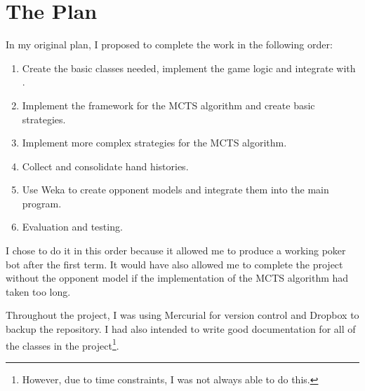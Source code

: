 \section{The Plan}								%




In my original plan, I proposed to complete the work in the following order:
\begin{enumerate}
\item Create the basic classes needed, implement the game logic and integrate with \pap.
\item Implement the framework for the MCTS algorithm and create basic strategies.
\item Implement more complex strategies for the MCTS algorithm. 
\item Collect and consolidate hand histories. 
\item Use Weka to create opponent models and integrate them into the main program.
\item Evaluation and testing. 
\end{enumerate}


I chose to do it in this order because it allowed me to produce a working poker bot after the first term. It would have also allowed me to complete the project without the opponent model if the implementation of the MCTS algorithm had taken too long. 


Throughout the project, I was using Mercurial for version control and Dropbox to backup the repository. I had also intended to write good documentation for all of the classes in the project\footnote{However, due to time constraints, I was not always able to do this.}.



